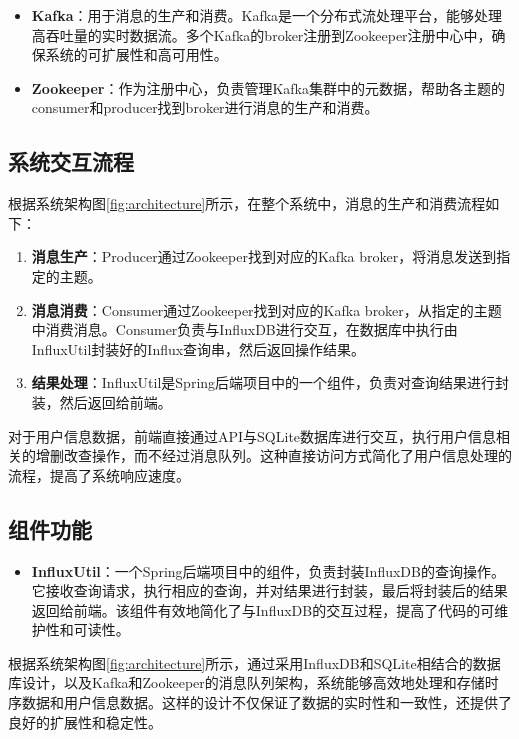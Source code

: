 \documentclass[oneside]{xduugthesis}
\begin{document}
\begin{itemize}[nosep]
    \item \textbf{Kafka}：用于消息的生产和消费。Kafka是一个分布式流处理平台，能够处理高吞吐量的实时数据流。多个Kafka的broker注册到Zookeeper注册中心中，确保系统的可扩展性和高可用性。
    \item \textbf{Zookeeper}：作为注册中心，负责管理Kafka集群中的元数据，帮助各主题的consumer和producer找到broker进行消息的生产和消费。
\end{itemize}

\subsection{系统交互流程}

根据系统架构图\ref{fig:architecture}所示，在整个系统中，消息的生产和消费流程如下：

\begin{enumerate}[nosep]
    \item \textbf{消息生产}：Producer通过Zookeeper找到对应的Kafka broker，将消息发送到指定的主题。
    \item \textbf{消息消费}：Consumer通过Zookeeper找到对应的Kafka broker，从指定的主题中消费消息。Consumer负责与InfluxDB进行交互，在数据库中执行由InfluxUtil封装好的Influx查询串，然后返回操作结果。
    \item \textbf{结果处理}：InfluxUtil是Spring后端项目中的一个组件，负责对查询结果进行封装，然后返回给前端。
\end{enumerate}

对于用户信息数据，前端直接通过API与SQLite数据库进行交互，执行用户信息相关的增删改查操作，而不经过消息队列。这种直接访问方式简化了用户信息处理的流程，提高了系统响应速度。

\subsection{组件功能}

\begin{itemize}[nosep]
    \item \textbf{InfluxUtil}：一个Spring后端项目中的组件，负责封装InfluxDB的查询操作。它接收查询请求，执行相应的查询，并对结果进行封装，最后将封装后的结果返回给前端。该组件有效地简化了与InfluxDB的交互过程，提高了代码的可维护性和可读性。
\end{itemize}

根据系统架构图\ref{fig:architecture}所示，通过采用InfluxDB和SQLite相结合的数据库设计，以及Kafka和Zookeeper的消息队列架构，系统能够高效地处理和存储时序数据和用户信息数据。这样的设计不仅保证了数据的实时性和一致性，还提供了良好的扩展性和稳定性。
\end{document}
